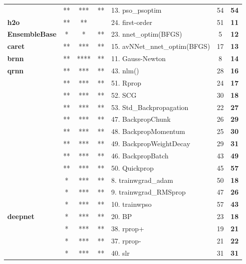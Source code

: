 \begin{Schunk}
\begin{table}
\begin{tabular}[t]{>{\bfseries}lccclc>{\bfseries}c}
\multirow{-3}{*}{\raggedright\arraybackslash CaDENCE} & ** & *** & ** & 13. pso\_psoptim & 54 & 54\\
\cmidrule{1-7}
h2o & ** & ** &  & 24. first-order & 51 & 11\\
\cmidrule{1-7}
EnsembleBase & * & * & ** & 23. nnet\_optim(BFGS) & 5 & 12\\
\cmidrule{1-7}
caret & ** & *** & ** & 15. avNNet\_nnet\_optim(BFGS) & 17 & 13\\
\cmidrule{1-7}
brnn & ** & **** & ** & 11. Gauss-Newton & 8 & 14\\
\cmidrule{1-7}
qrnn & ** & *** & ** & 43. nlm() & 28 & 16\\
\cmidrule{1-7}
 & ** & *** & ** & 51. Rprop & 24 & 17\\

 & ** & *** & ** & 52. SCG & 30 & 18\\

 & ** & *** & ** & 53. Std\_Backpropagation & 22 & 27\\

 & ** & *** & ** & 47. BackpropChunk & 26 & 29\\

 & ** & *** & ** & 48. BackpropMomentum & 25 & 30\\

 & ** & *** & ** & 49. BackpropWeightDecay & 29 & 31\\

 & ** & *** & ** & 46. BackpropBatch & 43 & 49\\

\multirow{-8}{*}{\raggedright\arraybackslash RSNNS} & ** & *** & ** & 50. Quickprop & 45 & 57\\
\cmidrule{1-7}
 & * & *** & ** & 8. trainwgrad\_adam & 50 & 18\\

 & * & *** & ** & 9. trainwgrad\_RMSprop & 47 & 26\\

\multirow{-3}{*}{\raggedright\arraybackslash automl} & * & *** & ** & 10. trainwpso & 57 & 43\\
\cmidrule{1-7}
deepnet & * & *** & ** & 20. BP & 23 & 18\\
\cmidrule{1-7}
 & * & *** & ** & 38. rprop+ & 19 & 21\\

 & * & *** & ** & 37. rprop- & 21 & 22\\

 & * & *** & ** & 40. slr & 31 & 31\\


\end{tabular}
\end{table}
\end{Schunk}
